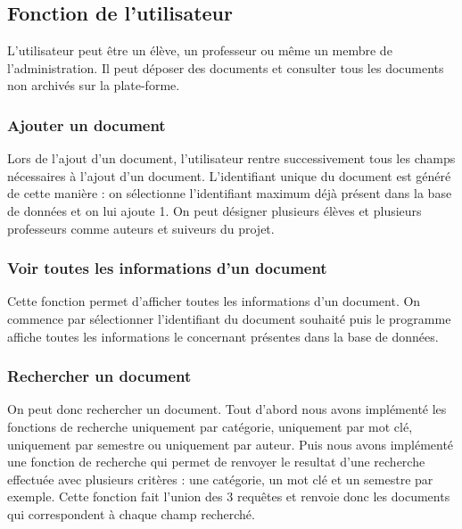 \documentclass[11pt]{report}
\begin{document}
\subsection{Fonction de l'utilisateur}

L'utilisateur peut être un élève, un professeur ou même un membre de l'administration. Il peut déposer des documents et consulter tous les documents non archivés sur la plate-forme.

\subsubsection{Ajouter un document}

Lors de l'ajout d'un document, l'utilisateur rentre successivement tous les champs nécessaires à l'ajout d'un document. L'identifiant unique du document est généré de cette manière : on sélectionne l'identifiant maximum déjà présent dans la base de données et on lui ajoute 1. 
On peut désigner plusieurs élèves et plusieurs professeurs comme auteurs et suiveurs du projet.

\subsubsection{Voir toutes les informations d'un document}

Cette fonction permet d'afficher toutes les informations d'un document. 
On commence par sélectionner l'identifiant du document souhaité puis le programme affiche toutes les informations le concernant présentes dans la base de données.

\subsubsection{Rechercher un document}
On peut donc rechercher un document. Tout d'abord nous avons implémenté les fonctions de recherche uniquement par catégorie, uniquement par mot clé, uniquement par semestre ou uniquement par auteur. Puis nous avons implémenté une fonction de recherche qui permet de renvoyer le resultat d'une recherche effectuée avec plusieurs critères : une catégorie, un mot clé et un semestre par exemple. Cette fonction fait l'union des 3 requêtes et renvoie donc les documents qui correspondent à chaque champ recherché.
\end{document}

